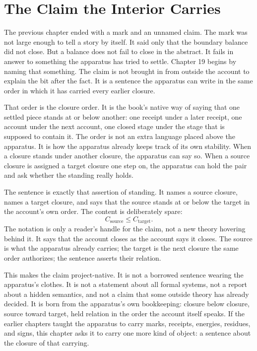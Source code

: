 \section{The Claim the Interior Carries}

The previous chapter ended with a mark and an unnamed claim. The mark was not large enough to
tell a story by itself. It said only that the boundary balance did not close. But a balance does
not fail to close in the abstract. It fails in answer to something the apparatus has tried to
settle. Chapter 19 begins by naming that something. The claim is not brought in from outside the
account to explain the bit after the fact. It is a sentence the apparatus can write in the same
order in which it has carried every earlier closure.

That order is the closure order. It is the book's native way of saying that one settled piece
stands at or below another: one receipt under a later receipt, one account under the next account,
one closed stage under the stage that is supposed to contain it. The order is not an extra
language placed above the apparatus. It is how the apparatus already keeps track of its own
stability. When a closure stands under another closure, the apparatus can say so. When a source
closure is assigned a target closure one step on, the apparatus can hold the pair and ask whether
the standing really holds.

The sentence is exactly that assertion of standing. It names a source closure, names a target
closure, and says that the source stands at or below the target in the account's own order. The
content is deliberately spare:
\[
  C_{\mathrm{source}} \leq C_{\mathrm{target}} .
\]
The notation is only a reader's handle for the claim, not a new theory hovering behind it. It
says that the account closes as the account says it closes. The source is what the apparatus
already carries; the target is the next closure the same order authorizes; the sentence asserts
their relation.

This makes the claim project-native. It is not a borrowed sentence wearing the apparatus's
clothes. It is not a statement about all formal systems, not a report about a hidden semantics,
and not a claim that some outside theory has already decided. It is born from the apparatus's
own bookkeeping: closure below closure, source toward target, held relation in the order the
account itself speaks. If the earlier chapters taught the apparatus to carry marks, receipts,
energies, residues, and signs, this chapter asks it to carry one more kind of object: a sentence
about the closure of that carrying.

